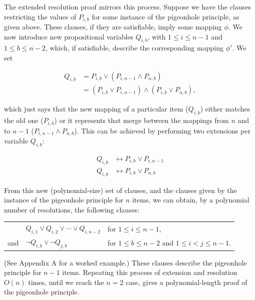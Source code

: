 \documentclass[proof,pdftex,11pt,a4]{article}
\begin{document}
The extended resolution proof mirrors this process. Suppose we have the clauses restricting the values of $P_{i,b}$ for some instance of the pigeonhole principle, as given above. These clauses, if they are satisfiable, imply some mapping $\phi$. We now introduce new propositional variables $Q_{i,b}$, with $1 \leq i \leq n-1$ and $1 \leq b \leq n-2$, which, if satisfiable, describe the corresponding mapping $\phi'$. We set

\begin{equation*}
  \begin{align*}
    Q_{i,b} &= P_{i,b} \vee (P_{i,n-1} \wedge P_{n,b}) \\
      &= (P_{i,b} \vee P_{i,n-1}) \wedge (P_{i,b} \vee P_{n,b}),
  \end{align*}
\end{equation*}

which just says that the new mapping of a particular item ($Q_{i,b}$) either matches the old one ($P_{i,b}$) or it represents that merge between the mappings from $n$ and to $n-1$ ($P_{i,n-1} \wedge P_{n,b}$). This can be achieved by performing two extensions per variable $Q_{i,b}$:

\begin{equation*}
  \begin{align*}
    Q_{i,b} &\leftrightarrow P_{i,b} \vee P_{i,n-1} \\
    Q_{i,b} &\leftrightarrow P_{i,b} \vee P_{n,b}
  \end{align*}
\end{equation*}

From this new (polynomial-size) set of clauses, and the clauses given by the instance of the pigeonhole principle for $n$ items, we can obtain, by a polynomial number of resolutions, the following clauses:

\begin{table}[h]
  \begin{tabular}{rll}
        & $Q_{i,1} \vee Q_{i,2} \vee \cdots \vee Q_{i,n-2}$ & for $1 \leq i \leq n-1$, \\
    and & $\neg Q_{i,b} \vee \neg Q_{j,b}$ & for $1 \leq b \leq n-2$ and $1 \leq i < j \leq n-1$.
  \end{tabular}
\end{table}
\FloatBarrier

(See Appendix A for a worked example.) These clauses describe the pigeonhole principle for $n-1$ items. Repeating this process of extension and resolution $O(n)$ times, until we reach the $n=2$ case, gives a polynomial-length proof of the pigeonhole principle.
\end{document}
